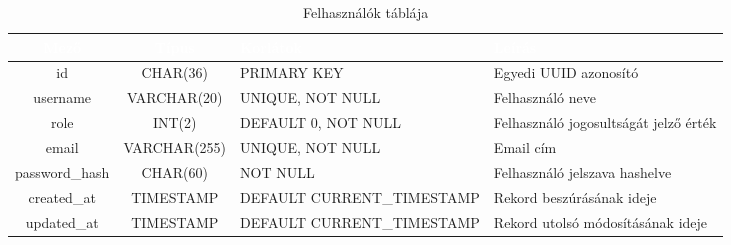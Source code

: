 \documentclass[12pt]{report}
\begin{document}
\begin{table}[h!]
    \centering
    \renewcommand{\arraystretch}{1.5}  %
    \begin{tabularx}{\textwidth}{|c|c|>{\raggedright\arraybackslash}X|>{\raggedright\arraybackslash}X|}  %
        \hline
        \rowcolor{gray!30} \textcolor{white}{\textbf{Mező}} & \textcolor{white}{\textbf{Típus}} & \textcolor{white}{\textbf{Korlátok}} & \textcolor{white}{\textbf{Leírás}} \\
        \hline
        id & CHAR(36) & PRIMARY KEY & Egyedi UUID azonosító \\
        \hline
        username & VARCHAR(20) & UNIQUE, NOT NULL & Felhasználó neve \\
        \hline
        role & INT(2) & DEFAULT 0, NOT NULL & Felhasználó jogosultságát jelző érték \\
        \hline
        email & VARCHAR(255) & UNIQUE, NOT NULL & Email cím \\
        \hline
        password\_hash & CHAR(60) & NOT NULL & Felhasználó jelszava hashelve \\
        \hline
        created\_at & TIMESTAMP & DEFAULT CURRENT\_TIMESTAMP & Rekord beszúrásának ideje \\
        \hline
        updated\_at & TIMESTAMP & DEFAULT CURRENT\_TIMESTAMP & Rekord utolsó módosításának ideje \\
        \hline
    \end{tabularx}
    \caption{Felhasználók táblája}
    \label{tab:users}
\end{table}
\end{document}
